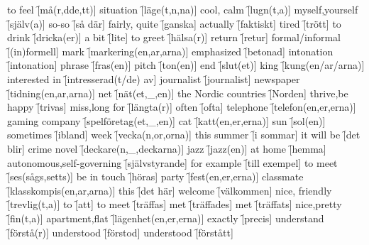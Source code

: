 \begin{questions}
    \begin{multicols}{2}
        \raggedcolumns
        \question to feel \f[må(r,dde,tt)]
        \question situation \f[läge(t,n,na)]
        \question cool, calm \f[lugn(t,a)]
        \question myself,yourself \f[själv(a)]
        \question so-so \f[så där]
        \question fairly, quite \f[ganska]
        \question actually \f[faktiskt]
        \question tired \f[trött]
        \question to drink \f[dricka(er)]
        \question a bit \f[lite]
        \question to greet \f[hälsa(r)]
        \question return \f[retur]
        \question formal/informal \f[(in)formell]
        \question mark \f[markering(en,ar,arna)]
        \question emphasized \f[betonad]
        \question intonation \f[intonation]
        \question phrase \f[fras(en)]
        \question pitch \f[ton(en)]
        \question end \f[slut(et)]
        \question king \f[kung(en/ar/arna)]
        \question interested in \f[intresserad(t/de) av]
        \question journalist \f[journalist]
        \question newspaper \f[tidning(en,ar,arna)]
        \question net \f [nät(et,\_,en)]
        \question the Nordic countries \f[Norden]
        \question thrive,be happy \f[trivas]
        \question miss,long for \f[längta(r)]
        \question often \f[ofta]
        \question telephone \f[telefon(en,er,erna)]
        \question gaming company \f[spelföretag(et,\_,en)]
        \question cat \f[katt(en,er,erna)]
        \question sun \f[sol(en)]
        \question sometimes \f[ibland]
        \question week \f[vecka(n,or,orna)]
        \question this summer \f[i sommar]
        \question it will be \f[det blir]
        \question crime novel \f[deckare(n,\_,deckarna)]
        \question jazz \f[jazz(en)]
        \question at home \f[hemma]
        \question autonomous,self-governing \f[självstyrande]
        \question for example \f[till exempel]
        \question to meet \f[ses(sågs,setts)]
        \question be in touch \f[höras]
        \question party \f[fest(en,er,erna)]
        \question classmate \f[klasskompis(en,ar,arna)]
        \question this \f[det här]
        \question welcome \f[välkommen]
        \question nice, friendly \f[trevlig(t,a)]
        \question to \f[att]
        \question to meet \f[träffas]
        \question met \f[träffades]
        \question met \f[träffats]
        \question nice,pretty \f[fin(t,a)]
        \question apartment,flat \f[lägenhet(en,er,erna)]
        \question exactly \f[precis]
        \question understand \f[förstå(r)]
        \question understood \f[förstod]
        \question understood \f[förstått]

\end{multicols}
\end{questions}
